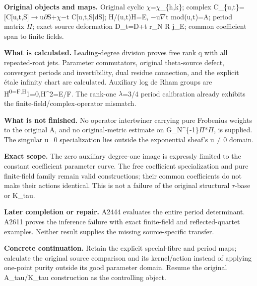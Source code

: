 \documentclass[10pt,a4paper,oneside]{report}
\begin{document}
\textbf{Original objects and maps.} Original cyclic
\allowbreak{}\ensuremath{χ}\allowbreak{}=\allowbreak{}\ensuremath{χ}\allowbreak{}\_\{h,k\};
complex
C\_\{u,t\}=[C[u,t,S]\allowbreak{}\ensuremath{→}\allowbreak{}u\allowbreak{}\ensuremath{∂}\allowbreak{}S+\allowbreak{}\ensuremath{χ}\allowbreak{}\allowbreak{}\ensuremath{−}\allowbreak{}t
C{[}u,t,S{]}dS{]}; H/(u,t)H=E,
\allowbreak{}\ensuremath{−}\allowbreak{}u\allowbreak{}\ensuremath{∇}\allowbreak{}t
mod(u,t)=A; period matrix \allowbreak{}\ensuremath{Π}\allowbreak{};
exact source deformation D\_t=D+t r\_N R j\_E; common coefficient span
to finite fields.

\textbf{What is calculated.} Leading-degree division proves free rank q
with all repeated-root jets. Parameter commutators, original
theta-source defect, convergent periods and invertibility, dual residue
connection, and the explicit étale infinity chart are calculated.
Auxiliary log de Rham groups are H\textsuperscript{0=F,H}1=0,H\^{}2=E/F.
The rank-one \allowbreak{}\ensuremath{λ}\allowbreak{}=3/4 period
calibration already exhibits the finite-field/complex-operator mismatch.

\textbf{What is not finished.} No operator intertwiner carrying pure
Frobenius weights to the original A, and no original-metric estimate on
G\_N\textasciicircum{}\{-1\}\allowbreak{}\ensuremath{Π}\allowbreak{}*\allowbreak{}\ensuremath{Π}\allowbreak{},
is supplied. The singular u=0 specialization lies outside the
exponential sheaf's u\allowbreak{}\ensuremath{≠}\allowbreak{}0 domain.

\textbf{Exact scope.} The zero auxiliary degree-one image is expressly
limited to the constant coefficient parameter curve. The free
coefficient specialization and pure finite-field family remain valid
constructions; their common coefficients do not make their actions
identical. This is not a failure of the original structural
\allowbreak{}\ensuremath{τ}\allowbreak{}-base or K\_tau.

\textbf{Later completion or repair.} A2444 evaluates the entire period
determinant. A2611 proves the inference failure with exact finite-field
and reflected-quartet examples. Neither result supplies the missing
source-specific transfer.

\textbf{Concrete continuation.} Retain the explicit special-fibre and
period maps; calculate the original source comparison and its
kernel/action instead of applying one-point purity outside its good
parameter domain. Resume the original A\_tau/K\_tau construction as the
controlling object.
\end{document}
